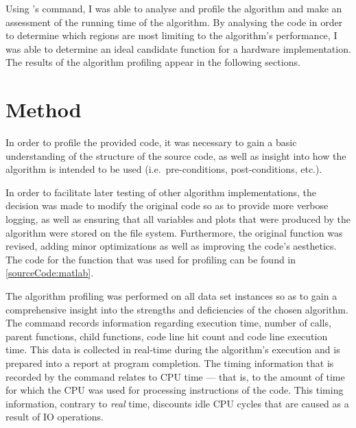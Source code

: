 Using 's  command, I was able to analyse and
profile the  algorithm and make
an assessment of the running time of the algorithm. By analysing the code in
order to determine which regions are most limiting to the algorithm's
performance, I was able to determine an ideal candidate function for a hardware
implementation. The results of the algorithm profiling appear in the following
sections.

\section{Method}
\label{software:algorithmProfiling:matlab:method}
In order to profile the provided  code, it was necessary to
gain a basic understanding of the structure of the source code, as well as
insight into how the algorithm is intended to be used (i.e.\ pre-conditions,
post-conditions, etc.).

In order to facilitate later testing of other algorithm implementations, the
decision was made to modify the original code so as to provide more verbose
logging, as well as ensuring that all variables and plots that were produced by
the algorithm were stored on the file system. Furthermore, the original
 function was revised, adding minor
optimizations as well as improving the code's aesthetics. The 
code for the  function that was used for
profiling can be found in \autoref{sourceCode:matlab}.

The algorithm profiling was performed on all data set instances so as to gain a
comprehensive insight into the strengths and deficiencies of the chosen
algorithm. The   command records information
regarding execution time, number of calls, parent functions, child functions,
code line hit count and code line execution time. This data is collected in
real-time during the algorithm's execution and is prepared into a report at
program completion. The timing information that is recorded by the
 command relates to \gls{CPU} time --- that is, to the amount
of time for which the \gls{CPU} was used for processing instructions of the
code. This timing information, contrary to \emph{real} time, discounts idle
\gls{CPU} cycles that are caused as a result of \gls{IO} operations.

